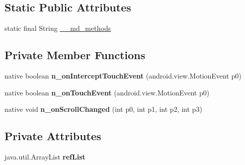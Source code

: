 \subsection*{Static Public Attributes}
\begin{DoxyCompactItemize}
\item 
static final String \hyperlink{classmd5b60ffeb829f638581ab2bb9b1a7f4f3f_1_1AHorizontalScrollView_a49c664fbcff063e605248e4205b9125b}{\+\_\+\+\_\+md\+\_\+methods}
\end{DoxyCompactItemize}
\subsection*{Private Member Functions}
\begin{DoxyCompactItemize}
\item 
\mbox{\label{classmd5b60ffeb829f638581ab2bb9b1a7f4f3f_1_1AHorizontalScrollView_abeb662d99b08cae3ef529bc96a067459}} 
native boolean {\bfseries n\+\_\+on\+Intercept\+Touch\+Event} (android.\+view.\+Motion\+Event p0)
\item 
\mbox{\label{classmd5b60ffeb829f638581ab2bb9b1a7f4f3f_1_1AHorizontalScrollView_ade5ec2fc49cc6e86e26e3e2ce37f57e5}} 
native boolean {\bfseries n\+\_\+on\+Touch\+Event} (android.\+view.\+Motion\+Event p0)
\item 
\mbox{\label{classmd5b60ffeb829f638581ab2bb9b1a7f4f3f_1_1AHorizontalScrollView_a4b46a558428eb6cb7b3ed5f20a7f091e}} 
native void {\bfseries n\+\_\+on\+Scroll\+Changed} (int p0, int p1, int p2, int p3)
\end{DoxyCompactItemize}
\subsection*{Private Attributes}
\begin{DoxyCompactItemize}
\item 
\mbox{\label{classmd5b60ffeb829f638581ab2bb9b1a7f4f3f_1_1AHorizontalScrollView_aceed0b3ec50f57c238e9674fd57c3c26}} 
java.\+util.\+Array\+List {\bfseries ref\+List}
\end{DoxyCompactItemize}


